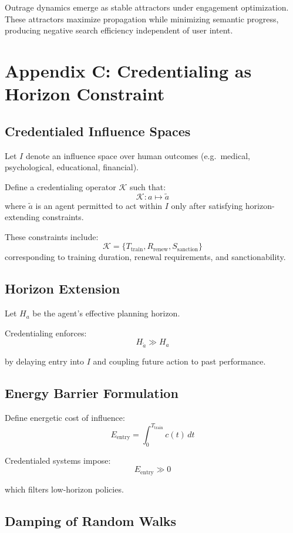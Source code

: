 \documentclass[12pt]{article}
\begin{document}
Outrage dynamics emerge as stable attractors under engagement optimization.
These attractors maximize propagation while minimizing semantic progress,
producing negative search efficiency independent of user intent.

\section{Appendix C: Credentialing as Horizon Constraint}

\subsection{Credentialed Influence Spaces}

Let $I$ denote an influence space over human outcomes (e.g.\ medical, psychological, educational, financial).

Define a credentialing operator $\mathcal{K}$ such that:
\[
\mathcal{K}: a \mapsto \tilde{a}
\]
where $\tilde{a}$ is an agent permitted to act within $I$ only after satisfying horizon-extending constraints.

These constraints include:
\[
\mathcal{K} = \{T_{\text{train}}, R_{\text{renew}}, S_{\text{sanction}}\}
\]
corresponding to training duration, renewal requirements, and sanctionability.

\subsection{Horizon Extension}

Let $H_a$ be the agent’s effective planning horizon.

Credentialing enforces:
\[
H_{\tilde{a}} \gg H_a
\]

by delaying entry into $I$ and coupling future action to past performance.

\subsection{Energy Barrier Formulation}

Define energetic cost of influence:
\[
E_{\text{entry}} = \int_0^{T_{\text{train}}} c(t)\, dt
\]

Credentialed systems impose:
\[
E_{\text{entry}} \gg 0
\]

which filters low-horizon policies.

\subsection{Damping of Random Walks}
\end{document}
